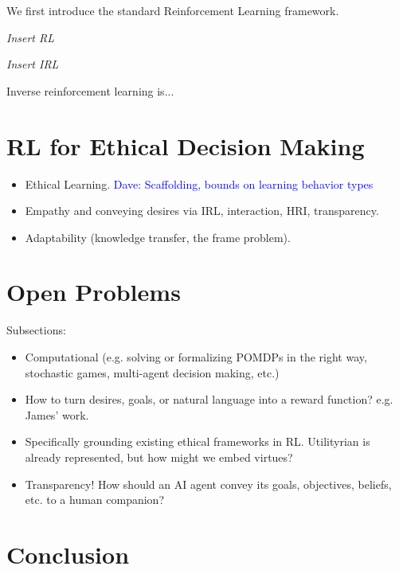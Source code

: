 \documentclass[11pt]{amsart}
\newcommand\davenote[1]{\textcolor{blue}{Dave: #1}}
\begin{document}
We first introduce the standard Reinforcement Learning framework.

{\it Insert RL}

{\it Insert IRL}

Inverse reinforcement learning is...

\section{RL for Ethical Decision Making}

\begin{itemize}
\item Ethical Learning. \davenote{Scaffolding, bounds on learning behavior types}
\item Empathy and conveying desires via IRL, interaction, HRI, transparency.
\item Adaptability (knowledge transfer, the frame problem).
\end{itemize}


\section{Open Problems}

Subsections:
\begin{itemize}
\item Computational (e.g. solving or formalizing POMDPs in the right way, stochastic games, multi-agent decision making, etc.)
\item How to turn desires, goals, or natural language into a reward function? e.g. James' work.
\item Specifically grounding existing ethical frameworks in RL. Utilityrian is already represented, but how might we embed virtues?
\item Transparency! How should an AI agent convey its goals, objectives, beliefs, etc. to a human companion?
\end{itemize}


\section{Conclusion}




\end{document}
